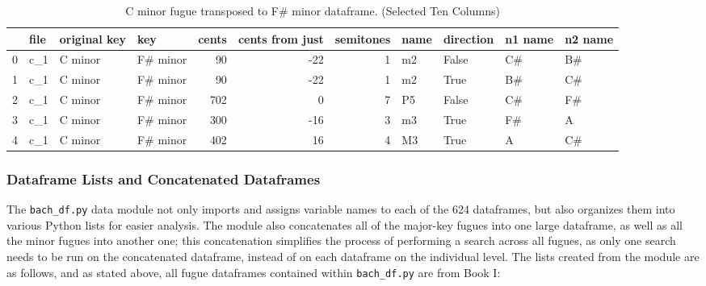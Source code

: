 \begin{singlespace}
\begin{table}[H]
\centering
\tiny
\begin{tabular}{|llllrrrllll|}
\hline
\textbf{{}} & \textbf{file} & \textbf{original key} & \textbf{      key} & \textbf{ cents} & \textbf{ cents from just} & \textbf{ semitones} & \textbf{name} & \textbf{direction} & \textbf{n1 name} & \textbf{n2 name }\\
\hline
0 &  c\_1 &      C minor &  F\# minor &     90 &              -22 &          1 &   m2 &     False &      C\# &      B\# \\
1 &  c\_1 &      C minor &  F\# minor &     90 &              -22 &          1 &   m2 &      True &      B\# &      C\# \\
2 &  c\_1 &      C minor &  F\# minor &    702 &                0 &          7 &   P5 &     False &      C\# &      F\# \\
3 &  c\_1 &      C minor &  F\# minor &    300 &              -16 &          3 &   m3 &      True &      F\# &       A \\
4 &  c\_1 &      C minor &  F\# minor &    402 &               16 &          4 &   M3 &      True &       A &      C\# \\
\hline
\end{tabular}
\caption{C minor fugue transposed to F\# minor dataframe. (Selected Ten Columns) }
\end{table}
\normalsize
\end{singlespace}


    \subsubsection{Dataframe Lists and Concatenated
Dataframes}\label{dataframe-lists-and-concatenated-dataframes}

The \texttt{bach\_df.py} data module not only imports and assigns
variable names to each of the 624 dataframes, but also organizes them
into various Python lists for easier analysis. The module also
concatenates all of the major-key fugues into one large dataframe, as
well as all the minor fugues into another one; this concatenation
simplifies the process of performing a search across all fugues, as only
one search needs to be run on the concatenated dataframe, instead of on
each dataframe on the individual level. The lists created from the
module are as follows, and as stated above, all fugue dataframes
contained within \texttt{bach\_df.py} are from Book I:

